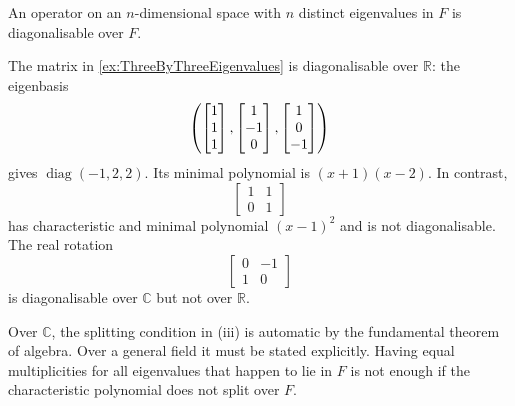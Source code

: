 \begin{Corollary}
An operator on an $n$-dimensional space with $n$ distinct eigenvalues in $F$ is diagonalisable over $F$.
\end{Corollary}

\begin{Example}
The matrix in \cref{ex:ThreeByThreeEigenvalues} is diagonalisable over $\mathbb R$: the eigenbasis
\begin{equation*}
\pqty{\begin{bmatrix}1\\1\\1\end{bmatrix},\begin{bmatrix}1\\-1\\0\end{bmatrix},\begin{bmatrix}1\\0\\-1\end{bmatrix}}
\end{equation*}
gives $\operatorname{diag}(-1,2,2)$. Its minimal polynomial is $(x+1)(x-2)$. In contrast,
\begin{equation*}
\begin{bmatrix}1&1\\0&1\end{bmatrix}
\end{equation*}
has characteristic and minimal polynomial $(x-1)^2$ and is not diagonalisable. The real rotation
\begin{equation*}
\begin{bmatrix}0&-1\\1&0\end{bmatrix}
\end{equation*}
is diagonalisable over $\mathbb C$ but not over $\mathbb R$.
\end{Example}

\begin{Remark*}
Over $\mathbb C$, the splitting condition in (iii) is automatic by the fundamental theorem of algebra. Over a general field it must be stated explicitly. Having equal multiplicities for all eigenvalues that happen to lie in $F$ is not enough if the characteristic polynomial does not split over $F$.
\end{Remark*}
